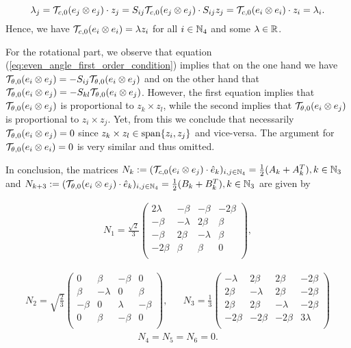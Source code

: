 \begin{equation}
\lambda_j = \mathcal{T}_{c,0}(e_j \otimes e_j) \cdot z_j = S_{ij} \mathcal{T}_{c,0}(e_j \otimes e_j) \cdot S_{ij} z_j = \mathcal{T}_{c,0}(e_i \otimes e_i) \cdot z_i = \lambda_i.
\end{equation}
Hence, we have $\mathcal{T}_{c,0}(e_i\otimes e_i) = \lambda z_i$ for all $i\in \mathbb{N}_4$ and some $\lambda \in \mathbb{R}$.

For the rotational part, we observe that equation (\ref{eq:even_angle_first_order_condition}) implies that on the one hand we have $\mathcal{T}_{\theta,0}(e_i \otimes e_j) = - S_{ij} \mathcal{T}_{\theta,0}(e_i \otimes e_j)$ and on the other hand that $\mathcal{T}_{\theta,0}(e_i \otimes e_j) = -S_{kl} \mathcal{T}_{\theta,0}(e_i \otimes e_j)$. However, the first equation implies that $\mathcal{T}_{\theta,0}(e_i \otimes e_j)$ is proportional to $z_k \times z_l$, while the second implies that $\mathcal{T}_{\theta,0}(e_i \otimes e_j)$ is proportional to $z_i \times z_j$. Yet, from this we conclude that necessarily $\mathcal{T}_{\theta,0}(e_i \otimes e_j) = 0$ since $z_k \times z_l \in \operatorname{span}\{z_i, z_j\}$ and vice-versa. The argument for $\mathcal{T}_{\theta,0}(e_i \otimes e_i)  = 0$ is very similar and thus omitted.

In conclusion, the matrices $N_k :=( \mathcal{T}_{c,0}(e_i \otimes e_j)\cdot  \hat{e}_k)_{i,j \in \mathbb{N}_4}  = \tfrac{1}{2}(A_k + A_k^T), k \in \mathbb{N}_3$ and $N_{k + 3} := ( \mathcal{T}_{\theta,0}(e_i \otimes e_j)\cdot  \hat{e}_k)_{i,j \in \mathbb{N}_4}  = \tfrac{1}{2}(B_k + B_k^T), k \in \mathbb{N}_3$ are given by


\begin{align}
 N_1 = \frac{\sqrt{2}}{3}\left(
\begin{array}{cccc}
 2 \lambda & -\beta & -\beta & -2 \beta \\
 -\beta & -\lambda & 2 \beta & \beta \\
 -\beta & 2 \beta & -\lambda & \beta \\
 -2 \beta & \beta & \beta & 0 \\
\end{array}
\right),
\end{align}

\begin{eqnarray}
N_2 =\sqrt{\frac{2}{3}} \left(
\begin{array}{cccc}
 0 & \beta & -\beta & 0 \\
 \beta & -\lambda & 0 & \beta \\
 -\beta & 0 & \lambda & -\beta \\
 0 & \beta & -\beta & 0 \\
\end{array}
\right), & &
 N_3 = \frac{1}{3}\left(
\begin{array}{cccc}
 -\lambda & 2 \beta & 2 \beta & -2 \beta \\
 2 \beta & -\lambda & 2 \beta & -2 \beta \\
 2 \beta & 2 \beta & -\lambda & -2 \beta \\
 -2 \beta & -2 \beta & -2 \beta & 3 \lambda \\
\end{array}
\right)
\end{eqnarray}
\renewcommand{\arraystretch}{1}
\begin{align}
N_4 = N_5 = N_6 = 0.
\end{align}


